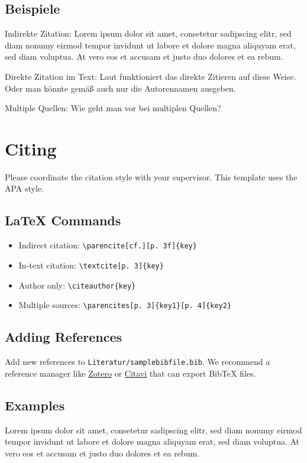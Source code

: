  \subsection{Beispiele}
  Indirekte Zitation: Lorem ipsum dolor sit amet, consetetur sadipscing elitr, sed diam nonumy eirmod tempor invidunt ut labore et dolore magna aliquyam erat, sed diam voluptua. At vero eos et accusam et justo duo dolores et ea rebum.\parencite[vgl.][S. 3f]{FederalMinistryforEconomicAffairs.2022}

  Direkte Zitation im Text: Laut \textcite[S. 3]{DAgostino.2021} funktioniert das direkte Zitieren auf diese Weise.
  Oder man könnte gemäß \citeauthor{Kritzinger.2018} auch nur die Autorennamen ausgeben.

  Multiple Quellen: Wie geht man vor bei multiplen Quellen? \parencites[S. 3]{Borrmann.2018}[S. 4]{Kritzinger.2018}

\else
  \section{Citing}
  Please coordinate the citation style with your supervisor. This template uses the APA style.

  \subsection{LaTeX Commands}
  \begin{itemize}
    \item Indirect citation: \verb|\parencite[cf.][p. 3f]{key}|
    \item In-text citation: \verb|\textcite[p. 3]{key}|
    \item Author only: \verb|\citeauthor{key}|
    \item Multiple sources: \verb|\parencites[p. 3]{key1}[p. 4]{key2}|
  \end{itemize}

  \subsection{Adding References}
  Add new references to \texttt{Literatur/samplebibfile.bib}. We recommend a reference manager like \href{https://www.zotero.org/}{Zotero} or \href{https://www.citavi.com/}{Citavi} that can export BibTeX files.

  \subsection{Examples}
  Lorem ipsum dolor sit amet, consetetur sadipscing elitr, sed diam nonumy eirmod tempor invidunt ut labore et dolore magna aliquyam erat, sed diam voluptua. At vero eos et accusam et justo duo dolores et ea rebum. \parencite[cf.][p. 3f]{FederalMinistryforEconomicAffairs.2022}

